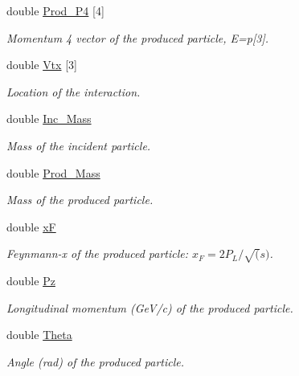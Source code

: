 \begin{DoxyCompactItemize}
double \hyperlink{class_neutrino_flux_reweight_1_1_interaction_data_aeb1a90172c41b31676c9b9f2587684b4}{Prod\-\_\-\-P4} \mbox{[}4\mbox{]}
\begin{DoxyCompactList}\small\item\em Momentum 4 vector of the produced particle, E=p\mbox{[}3\mbox{]}. \end{DoxyCompactList}\item 
double \hyperlink{class_neutrino_flux_reweight_1_1_interaction_data_a682fc7155e7fabd38431d6aff21ebdd1}{Vtx} \mbox{[}3\mbox{]}
\begin{DoxyCompactList}\small\item\em Location of the interaction. \end{DoxyCompactList}\item 
double \hyperlink{class_neutrino_flux_reweight_1_1_interaction_data_abad3c8f9d2c30dc7105dc9d67125b7c8}{Inc\-\_\-\-Mass}
\begin{DoxyCompactList}\small\item\em Mass of the incident particle. \end{DoxyCompactList}\item 
double \hyperlink{class_neutrino_flux_reweight_1_1_interaction_data_a635f8d931a62a5d8cdda2cf755f4f98a}{Prod\-\_\-\-Mass}
\begin{DoxyCompactList}\small\item\em Mass of the produced particle. \end{DoxyCompactList}\item 
double \hyperlink{class_neutrino_flux_reweight_1_1_interaction_data_afd47c094f4fa78df269a0cfd5de2d6cd}{x\-F}
\begin{DoxyCompactList}\small\item\em Feynmann-\/x of the produced particle\-: $ x_{F} = 2P_{L}/\sqrt(s) $. \end{DoxyCompactList}\item 
double \hyperlink{class_neutrino_flux_reweight_1_1_interaction_data_a95a42582b8a1d910bc254cb74480b44f}{Pz}
\begin{DoxyCompactList}\small\item\em Longitudinal momentum (Ge\-V/c) of the produced particle. \end{DoxyCompactList}\item 
double \hyperlink{class_neutrino_flux_reweight_1_1_interaction_data_a7b4a6f012f27fdda0c6521fdb033e863}{Theta}
\begin{DoxyCompactList}\small\item\em Angle (rad) of the produced particle. \end{DoxyCompactList}\item 

\end{DoxyCompactItemize}
